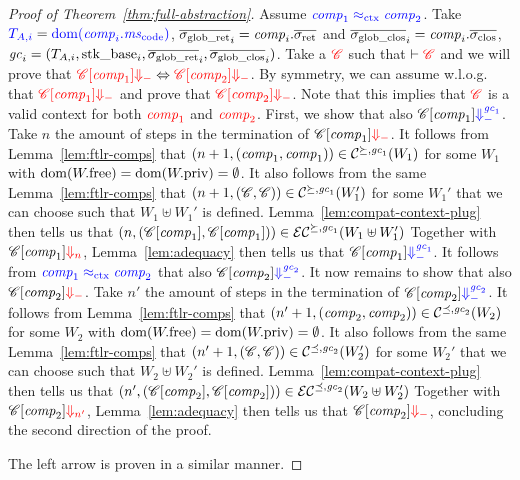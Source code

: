 \documentclass[acmsmall,review,anonymous]{acmart}\settopmatter{printfolios=true,printccs=false,printacmref=false}
\begin{document}
\begin{proof}[Proof of Theorem~\ref{thm:full-abstraction}]
    Assume $\src{\var{comp}_1} \sconeq \src{\var{comp}_2}$. Take $\src{\ta[,i]} = \src{\dom(\var{comp}_i.\mscode)}$, $\gsigrets_i = \var{comp}_i.\sigrets$ and $\gsigcloss_i = \var{comp}_i.\sigcloss$, $\gc_i = (\ta[,i],\stkb_i,\gsigrets_i,\gsigcloss_i)$.
%
    Take a $\trg{\context}$ such that $\vdash \trg{\context}$ and we will prove that
    $\trg{\plug{\context}{\var{comp}_1} \term} \Leftrightarrow
    \trg{\plug{\context}{\var{comp}_2} \term}$.
%
    By symmetry, we can assume w.l.o.g. that $\trg{\plug{\context}{\var{comp}_1} \term}$ and prove that $\trg{\plug{\context}{\var{comp}_2} \term}$.
    Note that this implies that $\trg{\context}$ is a valid context for both $\trg{\var{comp}_1}$ and $\trg{\var{comp}_2}$.
%
    First, we show that also $\plug{\context}{\var{comp}_1} \src{\sterm{\gc_1}}$.
    Take $n$ the amount of steps in the termination of $\plug{\context}{\var{comp}_1} \trg{\term}$.
    It follows from Lemma~\ref{lem:ftlr-comps} that $\npair[n+1]{(\var{comp}_1,\var{comp}_1)} \in \lrcomp[\succeq,\gc_1](W_1)$ for some $W_1$ with $\dom(\pwfree) = \dom(\pwpriv) = \emptyset$.
    It also follows from the same Lemma~\ref{lem:ftlr-comps} that $\npair[n+1]{(\context,\context)} \in \lrcomp[\succeq,\gc_1](W_1')$ for some $W_1'$ that we can choose such that $W_1 \uplus W_1'$ is defined.
    Lemma~\ref{lem:compat-context-plug} then tells us that $\npair{(\plug{\context}{\var{comp}_1}, \plug{\context}{\var{comp}_1})} \in \lrec[\succeq,\gc_1](W_1\uplus W_1')$
    Together with $\plug{\context}{\var{comp}_1} \trg{\term[n]}$, Lemma~\ref{lem:adequacy} then tells us that $\plug{\context}{\var{comp}_1} \src{\sterm{\gc_1}}$.
%
    It follows from $\src{\var{comp}_1} \sconeq \src{\var{comp}_2}$ that also $\plug{\context}{\var{comp}_2} \src{\sterm{\gc_2}}$.
%
    It now remains to show that also $\plug{\context}{\var{comp}_2} \trg{\term}$.
    Take $n'$ the amount of steps in the termination of $\plug{\context}{\var{comp}_2} \src{\sterm{\gc_2}}$.
    It follows from Lemma~\ref{lem:ftlr-comps} that $\npair[n'+1]{(\var{comp}_2,\var{comp}_2)} \in \lrcomp[\preceq,\gc_2](W_2)$ for some $W_2$ with $\dom(\pwfree) = \dom(\pwpriv) = \emptyset$.
    It also follows from the same Lemma~\ref{lem:ftlr-comps} that $\npair[n'+1]{(\context,\context)} \in \lrcomp[\preceq,\gc_2](W_2')$ for some $W_2'$ that we can choose such that $W_2 \uplus W_2'$ is defined.
    Lemma~\ref{lem:compat-context-plug} then tells us that $\npair[n']{(\plug{\context}{\var{comp}_2}, \plug{\context}{\var{comp}_2})} \in \lrec[\preceq,\gc_2](W_2\uplus W_2')$
    Together with $\plug{\context}{\var{comp}_2} \trg{\term[n']}$, Lemma~\ref{lem:adequacy} then tells us that $\plug{\context}{\var{comp}_2} \trg{\term}$, concluding the second direction of the proof.

 The left arrow is proven in a similar manner.
\end{proof}
\end{document}
